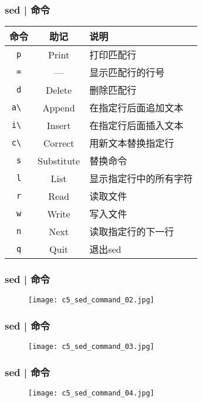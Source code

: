 \begin{frame}[fragile]
  \frametitle{sed | \alert{命令}}
  \begin{table}
    \centering
    \begin{tabularx}{0.8\textwidth}{ccX}
      \hline
      \rowcolor{blue!50}命令 & 助记 & 说明\\
      \hline
      \verb|p| & Print & 打印匹配行\\
      \verb|=| & --- & 显示匹配行的行号\\
      \verb|d| & Delete & 删除匹配行\\
      \verb|a\ | & Append &  在指定行后面追加文本\\
      \verb|i\ | & Insert & 在指定行后面插入文本\\
      \verb|c\ | & Correct & 用新文本替换指定行\\
      \verb|s| & Substitute & 替换命令\\
      \verb|l| & List & 显示指定行中的所有字符\\
      \verb|r| & Read & 读取文件\\
      \verb|w| & Write & 写入文件\\
      \verb|n| & Next & 读取指定行的下一行\\
      \verb|q| & Quit & 退出sed\\
      \hline
    \end{tabularx}
  \end{table}
\end{frame}

\begin{frame}
  \frametitle{sed | 命令}
  \begin{figure}
    \centering
    \texttt{[image: c5\_sed\_command\_02.jpg]}
  \end{figure}
\end{frame}

\begin{frame}
  \frametitle{sed | 命令}
  \begin{figure}
    \centering
    \texttt{[image: c5\_sed\_command\_03.jpg]}
  \end{figure}
\end{frame}

\begin{frame}
  \frametitle{sed | 命令}
  \begin{figure}
    \centering
    \texttt{[image: c5\_sed\_command\_04.jpg]}
  \end{figure}
\end{frame}

